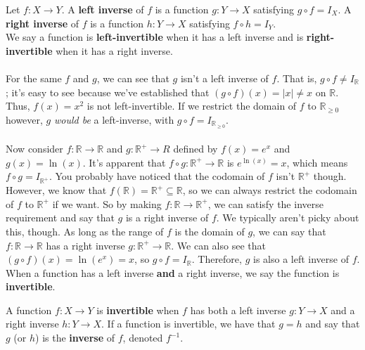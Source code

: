 \documentclass[12pt, a4paper, titlepage, twoside]{article}
\newcommand*{\R}{\mathbb{R}}
\begin{document}
	\begin{kp}
		Let $f : X \to Y$. A \textbf{left inverse} of $f$ is a function $g : Y \to X$ satisfying $g \circ f = I_X$. A \textbf{right inverse} of $f$ is
		a function $h : Y \to X$ satisfying $f \circ h = I_Y$.\\
		
		We say a function is \textbf{left-invertible} when it has a left inverse and is \textbf{right-invertible} when it has a right inverse.
	\end{kp} 
	
	\paragraph{}
	For the same $f$ and $g$, we can see that $g$ isn't a left inverse of $f$. That is, $g \circ f \neq I_{\R}$; it's easy to see because we've
	established that $(g \circ f)(x) = |x| \neq x$ on $\R$. Thus, $f(x) = x^2$ is not left-invertible. If we restrict the domain of $f$ to
	$\R_{\geqslant 0}$ however, $g$ \textit{would be} a left-inverse, with $g \circ f = I_{\R_{\geqslant 0}}$.
	
	\paragraph{}
	Now consider $f : \R \to \R$ and $g : \R^+ \to R$ defined by $f(x) = e^x$ and $g(x) = \ln(x)$. It's apparent that $f \circ g : \R^+ \to \R$
	is $e^{\ln(x)} = x$, which means $f \circ g = I_{\R^+}$. You probably have noticed that the codomain
	of $f$ isn't $\R^+$ though. However, we know that $f(\R) = \R^+ \subseteq \R$, so we can always restrict the codomain of $f$ to $\R^+$
	if we want. So by making $f : \R \to \R^+$, we can satisfy the inverse requirement and say that $g$ is a right inverse of $f$.
	We typically aren't picky about this, though. As long as the range of $f$ is the domain of $g$, we can say that $f : \R \to \R$
	has a right inverse $g : \R^+ \to \R$.
	We can also see that $(g \circ f)(x) = \ln(e^x) = x$, so $g \circ f = I_{\R}$. Therefore, $g$ is also a left inverse of $f$. When a function
	has a left inverse \textbf{and} a right inverse, we say the function is \textbf{invertible}.\\
	
	\begin{kp}
		A function $f : X \to Y$ is \textbf{invertible} when $f$ has both a left inverse $g : Y \to X$ and a right inverse $h : Y \to X$.
		If a function is invertible, we have that $g = h$ and say that $g$ (or $h$) is the \textbf{inverse} of $f$, denoted $f^{-1}$.
	\end{kp}
	
\end{document}
